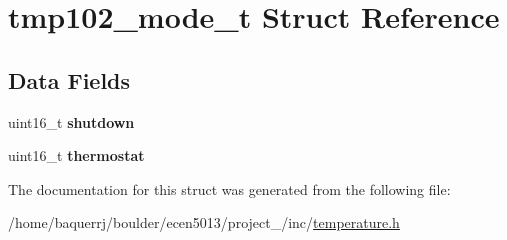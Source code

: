 \hypertarget{structtmp102__mode__t}{}\section{tmp102\+\_\+mode\+\_\+t Struct Reference}
\label{structtmp102__mode__t}
\subsection*{Data Fields}
\begin{DoxyCompactItemize}
\item 
\mbox{\label{structtmp102__mode__t_a7d61ffa7ef7486daac4598e996449112}} 
uint16\+\_\+t {\bfseries shutdown}
\item 
\mbox{\label{structtmp102__mode__t_a2a302676332b6988e3e6fe7001e06e44}} 
uint16\+\_\+t {\bfseries thermostat}
\end{DoxyCompactItemize}


The documentation for this struct was generated from the following file\+:\begin{DoxyCompactItemize}
\item 
/home/baquerrj/boulder/ecen5013/project\+\_/inc/\hyperlink{temperature_8h}{temperature.\+h}\end{DoxyCompactItemize}
